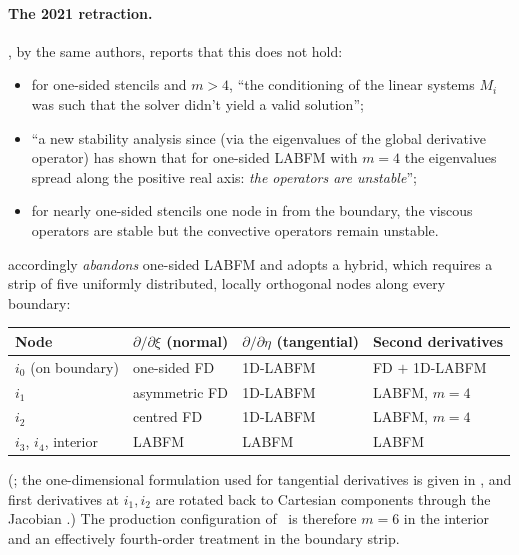 \documentclass[11pt,a4paper]{article}
\begin{document}
\paragraph{The 2021 retraction.} \cite[\S 7.1]{KL2021}, by the same authors, reports
that this does not hold:
\begin{itemize}
\item for one-sided stencils and $m>4$, ``the conditioning of the linear systems $M_i$
was such that the solver didn't yield a valid solution'';
\item ``a new stability analysis since \cite{KLN2020} (via the eigenvalues of the global
derivative operator) has shown that for one-sided LABFM with $m=4$ the eigenvalues
spread along the positive real axis: \emph{the operators are unstable}'';
\item for nearly one-sided stencils one node in from the boundary, the viscous operators
are stable but the convective operators remain unstable.
\end{itemize}
\cite{KL2021} accordingly \emph{abandons} one-sided LABFM and adopts a hybrid, which
requires a strip of five uniformly distributed, locally orthogonal nodes along every
boundary:

\begin{center}
\begin{tabular}{@{}llll@{}}
\toprule
\textbf{Node} & $\partial/\partial\xi$ \textbf{(normal)}
& $\partial/\partial\eta$ \textbf{(tangential)} & \textbf{Second derivatives} \\
\midrule
$i_0$ (on boundary) & one-sided FD & 1D-LABFM & FD $+$ 1D-LABFM \\
$i_1$ & asymmetric FD & 1D-LABFM & LABFM, $m=4$ \\
$i_2$ & centred FD & 1D-LABFM & LABFM, $m=4$ \\
$i_3$, $i_4$, interior & LABFM & LABFM & LABFM \\
\bottomrule
\end{tabular}
\end{center}
\noindent(\cite[Table 1]{KL2021}; the one-dimensional formulation used for tangential
derivatives is given in \cite[Appendix A, Eqs.~(A1)--(A7)]{KL2021}, and first
derivatives at $i_1,i_2$ are rotated back to Cartesian components through the Jacobian
\cite[Eq.~(24)]{KL2021}.) The production configuration of~\cite{KL2021} is therefore
$m=6$ in the interior and an effectively fourth-order treatment in the boundary strip.
\end{document}
